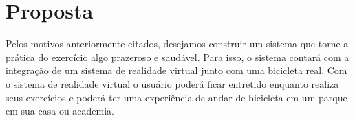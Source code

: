 \chapter[Proposta]{Proposta}

Pelos motivos anteriormente citados, desejamos construir um sistema que torne a prática do exercício algo prazeroso e saudável. Para isso, o sistema contará com a integração de um sistema de realidade virtual junto com uma bicicleta real. Com o sistema de realidade virtual o usuário poderá ficar entretido enquanto realiza seus exercícios e poderá ter uma experiência de andar de bicicleta em um parque em sua casa ou academia.


